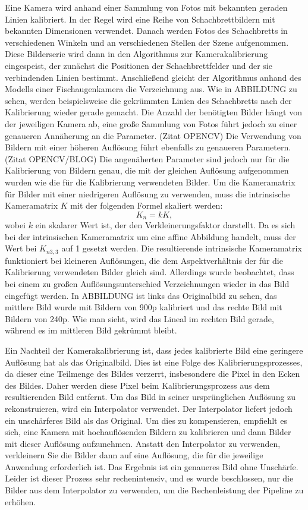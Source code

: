 \documentclass[arbeit=studie,oneside,BCOR=12mm]{ArbeitRST}
\begin{document}
Eine Kamera wird anhand einer Sammlung von Fotos mit bekannten geraden Linien
kalibriert. In der Regel wird eine Reihe von Schachbrettbildern mit bekannten
Dimensionen verwendet. Danach werden Fotos des Schachbretts in verschiedenen
Winkeln und an verschiedenen Stellen der Szene aufgenommen. Diese Bilderserie
wird dann in den Algorithmus zur Kamerakalibrierung eingespeist, der zunächst
die Positionen der Schachbrettfelder und der sie verbindenden Linien bestimmt.
Anschließend gleicht der Algorithmus anhand des Modells einer Fischaugenkamera
die Verzeichnung aus. Wie in ABBILDUNG zu sehen, werden beispielsweise die
gekrümmten Linien des Schachbretts nach der Kalibrierung wieder gerade gemacht.
Die Anzahl der benötigten Bilder hängt von der jeweiligen Kamera ab, eine große
Sammlung von Fotos führt jedoch zu einer genaueren Annäherung an die Parameter.
(Zitat OPENCV) Die Verwendung von Bildern mit einer höheren Auflösung führt
ebenfalls zu genaueren Parametern. (Zitat OPENCV/BLOG) Die angenäherten
Parameter sind jedoch nur für die Kalibrierung von Bildern genau, die mit der
gleichen Auflösung aufgenommen wurden wie die für die Kalibrierung verwendeten
Bilder. Um die Kameramatrix für Bilder mit einer niedrigeren Auflösung zu
verwenden, muss die intrinsische Kameramatrix $K$ mit der folgenden Formel
skaliert werden: 
\begin{equation} 
    K_n = k K, 
\end{equation} 
wobei $k$ ein skalarer Wert ist, der den Verkleinerungsfaktor darstellt. Da es
sich bei der intrinsischen Kameramatrix um eine affine Abbildung handelt, muss
der Wert bei $K_{n3, 3}$ auf 1 gesetzt werden. Die resultierende intrinsische
Kameramatrix funktioniert bei kleineren Auflösungen, die dem Aspektverhältnis
der für die Kalibrierung verwendeten Bilder gleich sind. Allerdings wurde
beobachtet, dass bei einem zu großen Auflösungsunterschied Verzeichnungen
wieder in das Bild eingefügt werden. In ABBILDUNG ist links das Originalbild zu
sehen, das mittlere Bild wurde mit Bildern von 900p kalibriert und das rechte
Bild mit Bildern von 240p. Wie man sieht, wird das Lineal im rechten Bild
gerade, während es im mittleren Bild gekrümmt bleibt.

Ein Nachteil der Kamerakalibrierung ist, dass jedes kalibrierte Bild eine
geringere Auflösung hat als das Originalbild. Dies ist eine Folge des
Kalibrierungsprozesses, da dieser eine Teilmenge des Bildes verzerrt,
insbesondere die Pixel in den Ecken des Bildes. Daher werden diese Pixel beim
Kalibrierungsprozess aus dem resultierenden Bild entfernt. Um das Bild in
seiner ursprünglichen Auflösung zu rekonstruieren, wird ein Interpolator
verwendet. Der Interpolator liefert jedoch ein unschärferes Bild als das
Original. Um dies zu kompensieren, empfiehlt es sich, eine Kamera mit
hochauflösenden Bildern zu kalibrieren und dann Bilder mit dieser Auflösung
aufzunehmen. Anstatt den Interpolator zu verwenden, verkleinern Sie die Bilder
dann auf eine Auflösung, die für die jeweilige Anwendung erforderlich ist.  Das
Ergebnis ist ein genaueres Bild ohne Unschärfe. Leider ist dieser Prozess sehr
rechenintensiv, und es wurde beschlossen, nur die Bilder aus dem Interpolator
zu verwenden, um die Rechenleistung der Pipeline zu erhöhen.
\end{document}
